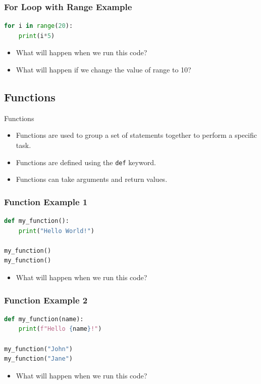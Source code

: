 \documentclass[aspectratio=169]{beamer}
\begin{document}
\begin{frame}[fragile]
    \frametitle{For Loop with Range Example}
    \begin{lstlisting}[language=Python, caption={For Loop with Range}]
for i in range(20):
    print(i*5)
    \end{lstlisting}

    \begin{itemize}
        \item What will happen when we run this code?
        \item What will happen if we change the value of range to 10?
    \end{itemize}
\end{frame}

\subsection{Functions}

\begin{frame}{Functions}
    \begin{itemize}
        \item Functions are used to group a set of statements together to perform a specific task.
        \item Functions are defined using the \texttt{def} keyword.
        \item Functions can take arguments and return values.
    \end{itemize}
\end{frame}

\begin{frame}[fragile]
    \frametitle{Function Example 1}
    \begin{lstlisting}[language=Python, caption={Function Example 1}]
def my_function():
    print("Hello World!")

my_function()
my_function()
\end{lstlisting}

    \begin{itemize}
        \item What will happen when we run this code?
    \end{itemize}
\end{frame}

\begin{frame}[fragile]
    \frametitle{Function Example 2}
    \begin{lstlisting}[language=Python, caption={Function Example 2}]
def my_function(name):
    print(f"Hello {name}!")

my_function("John")
my_function("Jane")
\end{lstlisting}

    \begin{itemize}
        \item What will happen when we run this code?
    \end{itemize}
\end{frame}
\end{document}
